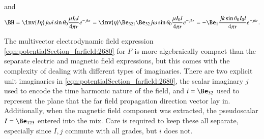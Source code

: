 {and
\begin{dmath}\label{eqn:potentialSection_farfield:2720}
\BH
=
\inv{I \eta}
j \omega i \sin\theta_0 \frac{\mu I_0 l}{4 \pi r} e^{-j k r}
=
\inv{\eta} \Be_{321} \Be_{32}
j \omega \sin\theta_0 \frac{\mu I_0 l}{4 \pi r} e^{-j k r}
=
-\Be_1 \frac{ j k \sin\theta_0 I_0 l}{4 \pi r} e^{-j k r}.
\end{dmath}

The multivector electrodynamic field expression
\cref{eqn:potentialSection_farfield:2680} for
\( F \) is more algebraically compact than the separate electric and magnetic field expressions, but this comes with the complexity of dealing with different types of imaginaries.
There are two explicit unit imaginaries in \cref{eqn:potentialSection_farfield:2680}, the scalar imaginary \( j \) used to encode the time harmonic nature of the field, and \( i = \Be_{32} \) used to represent the plane that the far field propagation direction vector lay in.
Additionally, when the magnetic field component was extracted, the pseudoscalar \( I = \Be_{123} \) entered into the mix.
Care is required to keep these all separate, especially since \( I, j \) commute with all grades, but \( i \) does not.
} %


